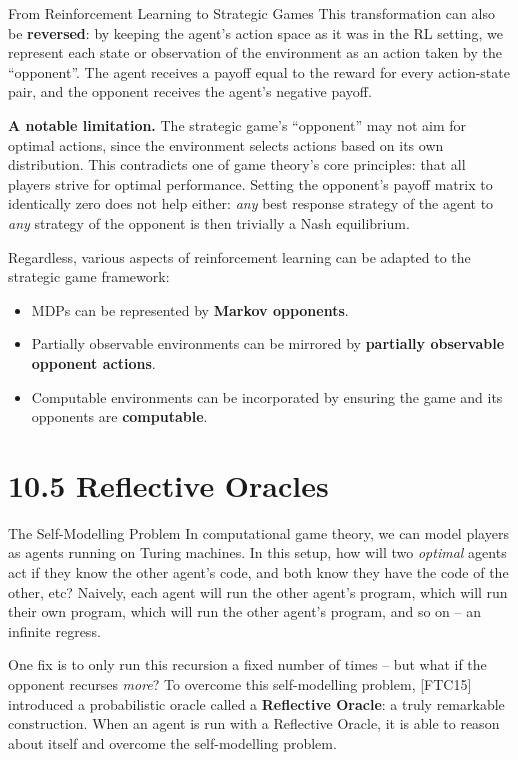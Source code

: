 \documentclass[aspectratio=169,10pt]{beamer}
\begin{document}
\begin{frame}{From Reinforcement Learning to Strategic Games}
  This transformation can also be \textbf{reversed}: by keeping the
  agent's action space as it was in the RL setting, we represent each
  state or observation of the environment as an action taken by the
  ``opponent''. The agent receives a payoff equal to the reward for every
  action-state pair, and the opponent receives the agent's negative
  payoff.

  \vspace{0.3em}
  \textbf{A notable limitation.} The strategic game's ``opponent'' may not
  aim for optimal actions, since the environment selects actions based on
  its own distribution. This contradicts one of game theory's core
  principles: that all players strive for optimal performance. Setting
  the opponent's payoff matrix to identically zero does not help either:
  \emph{any} best response strategy of the agent to \emph{any} strategy of
  the opponent is then trivially a Nash equilibrium.

  \vspace{0.3em}
  Regardless, various aspects of reinforcement learning can be adapted to
  the strategic game framework:
  \begin{itemize}
    \item MDPs can be represented by \textbf{Markov opponents}.
    \item Partially observable environments can be mirrored by
      \textbf{partially observable opponent actions}.
    \item Computable environments can be incorporated by ensuring the
      game and its opponents are \textbf{computable}.
  \end{itemize}
\end{frame}

\section{10.5 Reflective Oracles}

\begin{frame}{The Self-Modelling Problem}
  In computational game theory, we can model players as agents running on
  Turing machines. In this setup, how will two \emph{optimal} agents act
  if they know the other agent's code, and both know they have the code of
  the other, etc? Naively, each agent will run the other agent's program,
  which will run their own program, which will run the other agent's
  program, and so on -- an infinite regress.

  \vspace{0.3em}
  One fix is to only run this recursion a fixed number of times -- but
  what if the opponent recurses \emph{more}? To overcome this
  self-modelling problem, {\footnotesize[FTC15]} introduced a probabilistic
  oracle called a \textbf{Reflective Oracle}: a truly remarkable
  construction. When an agent is run with a Reflective Oracle, it is able
  to reason about itself and overcome the self-modelling problem.
\end{frame}
\end{document}
